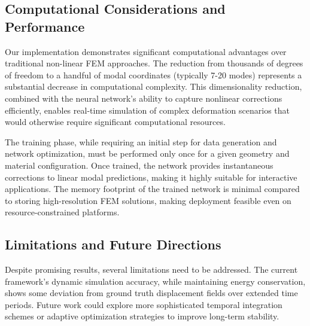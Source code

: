 \documentclass[11pt,a4paper]{article}
\numberwithin{equation}{section}
\begin{document}
\subsection{Computational Considerations and Performance}
Our implementation demonstrates significant computational advantages over traditional non-linear FEM approaches. The reduction from thousands of degrees of freedom to a handful of modal coordinates (typically 7-20 modes) represents a substantial decrease in computational complexity. This dimensionality reduction, combined with the neural network's ability to capture nonlinear corrections efficiently, enables real-time simulation of complex deformation scenarios that would otherwise require significant computational resources.

The training phase, while requiring an initial step for data generation and network optimization, must be performed only once for a given geometry and material configuration. Once trained, the network provides instantaneous corrections to linear modal predictions, making it highly suitable for interactive applications. The memory footprint of the trained network is minimal compared to storing high-resolution FEM solutions, making deployment feasible even on resource-constrained platforms.

\subsection{Limitations and Future Directions}
Despite promising results, several limitations need to be addressed. The current framework's dynamic simulation accuracy, while maintaining energy conservation, shows some deviation from ground truth displacement fields over extended time periods. Future work could explore more sophisticated temporal integration schemes or adaptive optimization strategies to improve long-term stability.
\end{document}
